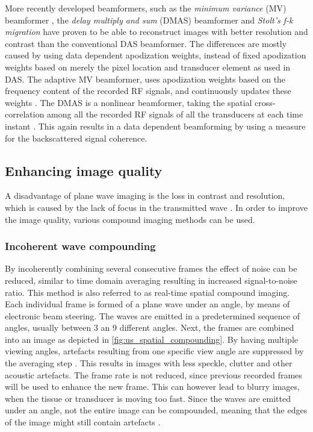 More recently developed beamformers, such as the \textit{minimum variance} (MV) beamformer \cite{holfort_plane_2008}, the \textit{delay multiply and sum} (DMAS) beamformer \cite{matrone_delay_2015} and \textit{Stolt's f-k migration} \cite{garcia_stolts_2013} have proven to be able to reconstruct images with better resolution and contrast than the conventional DAS beamformer. The differences are mostly caused by using data dependent apodization weights, instead of fixed apodization weights based on merely the pixel location and transducer element as used in DAS. The adaptive MV beamformer, uses apodization weights based on the frequency content of the recorded RF signals, and continuously updates these weights \cite{holfort_plane_2008}. The DMAS is a nonlinear beamformer, taking the spatial cross-correlation among all the recorded RF signals of all the transducers at each time instant \cite{matrone_delay_2015}. This again results in a data dependent beamforming by using a measure for the backscattered signal coherence. %

\bigskip




\subsection{Enhancing image quality}
A disadvantage of plane wave imaging is the loss in contrast and resolution, which is caused by the lack of focus in the transmitted wave \cite{montaldo_coherent_2009}. In order to improve the image quality, various compound imaging methods can be used. 


\subsubsection{Incoherent wave compounding}
By incoherently combining several consecutive frames the effect of noise can be reduced, similar to time domain averaging resulting in increased signal-to-noise ratio. This method is also referred to as real-time spatial compound imaging. Each individual frame is formed of a plane wave under an angle, by means of electronic beam steering. The waves are emitted in a predetermined sequence of angles, usually between 3 an 9 different angles. Next, the frames are combined into an image as depicted in \autoref{fig:us_spatial_compounding}. By having multiple viewing angles, artefacts resulting from one specific view angle are suppressed by the averaging step \cite{entrekin_real-time_2001}. This results in images with less speckle, clutter and other acoustic artefacts. The frame rate is not reduced, since previous recorded frames will be used to enhance the new frame. This can however lead to blurry images, when the tissue or transducer is moving too fast. Since the waves are emitted under an angle, not the entire image can be compounded, meaning that the edges of the image might still contain artefacts \cite{entrekin_real-time_2001}. 

